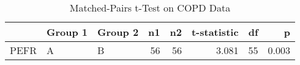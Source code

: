 \begin{table}

\caption{Matched-Pairs t-Test on COPD Data}
\centering
\begin{tabular}[t]{lllrrrrr}
\toprule
 & Group 1 & Group 2 & n1 & n2 & t-statistic & df & p\\
\midrule
PEFR & A & B & 56 & 56 & 3.081 & 55 & 0.003\\
\bottomrule
\end{tabular}
\end{table}
